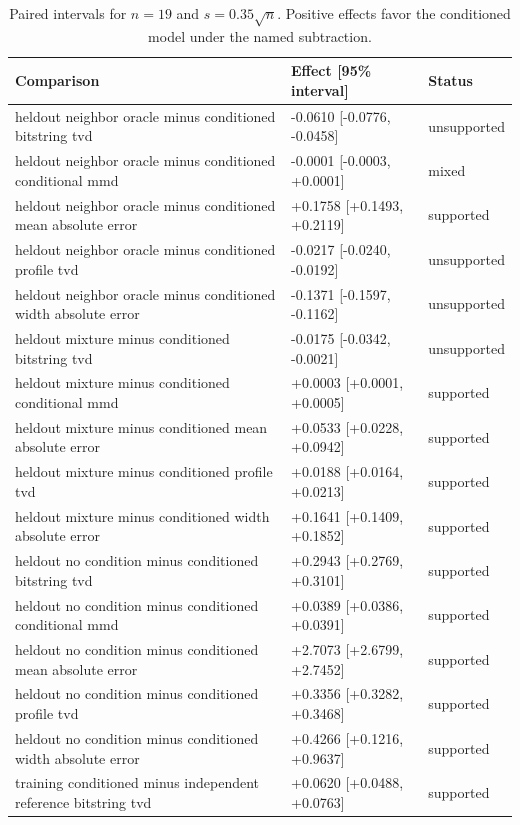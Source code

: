 \begin{table}[p]
\centering
\scriptsize
\setlength{\tabcolsep}{4pt}
\caption{Paired intervals for $n=19$ and $s=0.35\sqrt n$. Positive effects favor the conditioned model under the named subtraction.}
\label{tab:all-intervals-n19-w0.35}
\begin{tabular}{@{}p{}p{}p{}@{}}
\toprule
Comparison & Effect [95\% interval] & Status\\
\midrule
heldout neighbor oracle minus conditioned bitstring tvd & -0.0610 [-0.0776, -0.0458] & unsupported \\
heldout neighbor oracle minus conditioned conditional mmd & -0.0001 [-0.0003, +0.0001] & mixed \\
heldout neighbor oracle minus conditioned mean absolute error & +0.1758 [+0.1493, +0.2119] & supported \\
heldout neighbor oracle minus conditioned profile tvd & -0.0217 [-0.0240, -0.0192] & unsupported \\
heldout neighbor oracle minus conditioned width absolute error & -0.1371 [-0.1597, -0.1162] & unsupported \\
heldout mixture minus conditioned bitstring tvd & -0.0175 [-0.0342, -0.0021] & unsupported \\
heldout mixture minus conditioned conditional mmd & +0.0003 [+0.0001, +0.0005] & supported \\
heldout mixture minus conditioned mean absolute error & +0.0533 [+0.0228, +0.0942] & supported \\
heldout mixture minus conditioned profile tvd & +0.0188 [+0.0164, +0.0213] & supported \\
heldout mixture minus conditioned width absolute error & +0.1641 [+0.1409, +0.1852] & supported \\
heldout no condition minus conditioned bitstring tvd & +0.2943 [+0.2769, +0.3101] & supported \\
heldout no condition minus conditioned conditional mmd & +0.0389 [+0.0386, +0.0391] & supported \\
heldout no condition minus conditioned mean absolute error & +2.7073 [+2.6799, +2.7452] & supported \\
heldout no condition minus conditioned profile tvd & +0.3356 [+0.3282, +0.3468] & supported \\
heldout no condition minus conditioned width absolute error & +0.4266 [+0.1216, +0.9637] & supported \\
training conditioned minus independent reference bitstring tvd & +0.0620 [+0.0488, +0.0763] & supported \\

\end{tabular}
\end{table}
